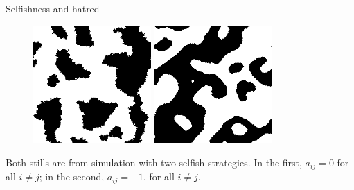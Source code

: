 \documentclass{beamer}
\begin{document}
\begin{frame}{Selfishness and hatred}
\begin{figure}
  \includegraphics[width=0.4\textwidth]{./images/Time200-Process0-1.png}
  \quad\vline\quad
  \includegraphics[width=0.4\textwidth]{./images/Time200-Process0.png}
\end{figure}
\begin{block}{}
  Both stills are from simulation with two selfish strategies. In the first, $a_{ij}=0$ for all $i\neq j$; in the second, $a_{ij}=-1$. for all $i\neq j$.
\end{block}
\end{frame}
\end{document}
